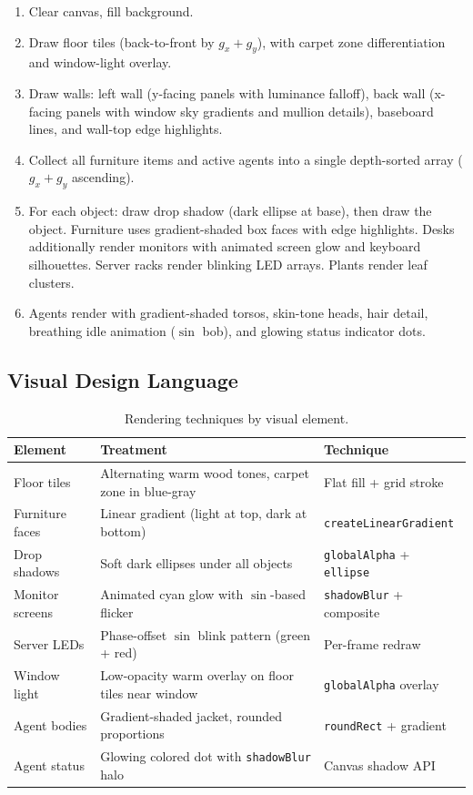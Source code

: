 \documentclass[11pt,letterpaper]{article}
\begin{document}
\begin{enumerate}[leftmargin=2em]
  \item Clear canvas, fill background.
  \item Draw floor tiles (back-to-front by $g_x + g_y$), with carpet zone differentiation and window-light overlay.
  \item Draw walls: left wall (y-facing panels with luminance falloff), back wall (x-facing panels with window sky gradients and mullion details), baseboard lines, and wall-top edge highlights.
  \item Collect all furniture items and active agents into a single depth-sorted array ($g_x + g_y$ ascending).
  \item For each object: draw drop shadow (dark ellipse at base), then draw the object. Furniture uses gradient-shaded box faces with edge highlights. Desks additionally render monitors with animated screen glow and keyboard silhouettes. Server racks render blinking LED arrays. Plants render leaf clusters.
  \item Agents render with gradient-shaded torsos, skin-tone heads, hair detail, breathing idle animation ($\sin$ bob), and glowing status indicator dots.
\end{enumerate}

\subsection{Visual Design Language}

\begin{table}[H]
\centering
\small
\begin{tabularx}{\textwidth}{lXl}
\toprule
\textbf{Element} & \textbf{Treatment} & \textbf{Technique} \\
\midrule
Floor tiles       & Alternating warm wood tones, carpet zone in blue-gray & Flat fill + grid stroke \\
Furniture faces   & Linear gradient (light at top, dark at bottom)         & \texttt{createLinearGradient} \\
Drop shadows      & Soft dark ellipses under all objects                   & \texttt{globalAlpha} + \texttt{ellipse} \\
Monitor screens   & Animated cyan glow with $\sin$-based flicker           & \texttt{shadowBlur} + composite \\
Server LEDs       & Phase-offset $\sin$ blink pattern (green + red)        & Per-frame redraw \\
Window light      & Low-opacity warm overlay on floor tiles near window     & \texttt{globalAlpha} overlay \\
Agent bodies      & Gradient-shaded jacket, rounded proportions            & \texttt{roundRect} + gradient \\
Agent status      & Glowing colored dot with \texttt{shadowBlur} halo      & Canvas shadow API \\
\bottomrule
\end{tabularx}
\caption{Rendering techniques by visual element.}
\end{table}
\end{document}
